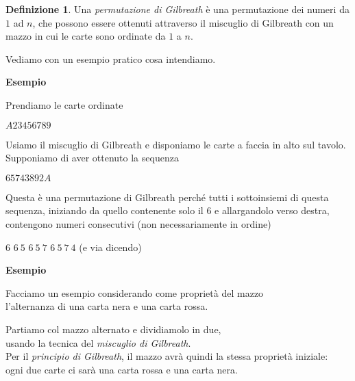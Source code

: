 \documentclass[8pt]{beamer}
\theoremstyle{plain}
\theoremstyle{definition}
\newtheorem{defin}[thm]{Definizione}
\begin{document}
\begin{frame}
\begin{center}
\begin{defin}Una \textit{permutazione di Gilbreath} è una permutazione dei numeri da $1$ ad $n$, che possono essere ottenuti attraverso il miscuglio di Gilbreath con un mazzo in cui le carte sono ordinate da $1$ a $n$. \end{defin}

\bigskip
\bigskip

Vediamo con un esempio pratico cosa intendiamo.
\end{center}
\end{frame}


\begin{frame}\begin{center}
\textbf{Esempio}

\bigskip
\medskip

Prendiamo le carte ordinate 

\medskip

$A$\quad$2$\quad$3$\quad$4$\quad$5$\quad$6$\quad$7$\quad$8$\quad$9$

\bigskip

Usiamo il miscuglio di Gilbreath e disponiamo le carte a faccia in alto sul tavolo. Supponiamo di aver ottenuto la sequenza

\medskip

$6$\quad$5$\quad$7$\quad$4$\quad$3$\quad$8$\quad$9$\quad$2$\quad$A$

\bigskip

Questa è una permutazione di Gilbreath perché tutti i sottoinsiemi di questa sequenza, iniziando da quello contenente solo il $6$ e allargandolo verso destra, \\ contengono numeri consecutivi (non necessariamente in ordine)

\medskip

$6$ \qquad $6 \: 5$ \qquad $6 \: 5 \: 7$ \qquad $6 \: 5 \: 7 \: 4$ \qquad (e via dicendo)
\end{center}
\end{frame}


\begin{frame}\begin{center}
\textbf{Esempio}

\bigskip
\medskip

Facciamo un esempio considerando come proprietà del mazzo \\l'alternanza di una carta nera e una carta rossa.

\medskip
\medskip

Partiamo col mazzo alternato e dividiamolo in due, \\usando la tecnica del \textit{miscuglio di Gilbreath}.\\Per il \textit{principio di Gilbreath}, il mazzo avrà quindi la stessa proprietà iniziale: \\ ogni due carte ci sarà una carta rossa e una carta nera.
\end{center}
\end{frame}
\end{document}
